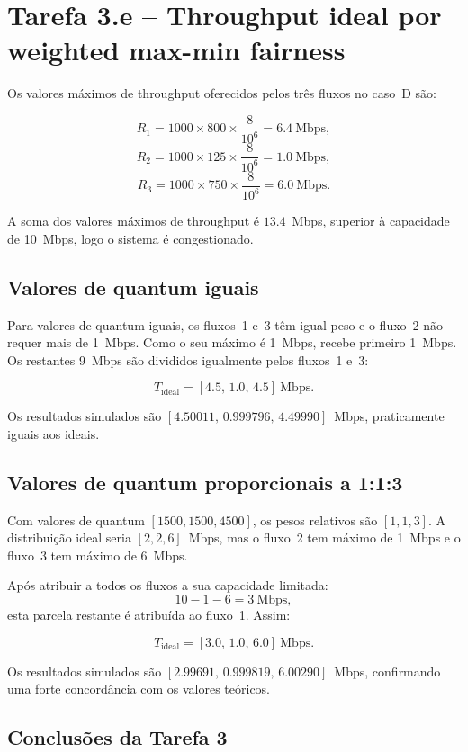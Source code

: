 \documentclass[11pt,a4paper]{article}
\begin{document}
\section{Tarefa 3.e -- Throughput ideal por weighted max-min fairness}

Os valores máximos de throughput oferecidos pelos três fluxos no caso~D são:

\[
R_1=1000\times800\times\frac{8}{10^6}=6.4~\text{Mbps},
\]
\[
R_2=1000\times125\times\frac{8}{10^6}=1.0~\text{Mbps},
\]
\[
R_3=1000\times750\times\frac{8}{10^6}=6.0~\text{Mbps}.
\]

A soma dos valores máximos de throughput é $13.4$~Mbps, superior à capacidade de 10~Mbps,
logo o sistema é congestionado.

\subsection*{Valores de quantum iguais}

Para valores de quantum iguais, os fluxos~1 e~3 têm igual peso e o fluxo~2 não requer
mais de 1~Mbps. Como o seu máximo é 1~Mbps, recebe primeiro 1~Mbps. Os restantes
9~Mbps são divididos igualmente pelos fluxos~1 e~3:

\[
T_{\text{ideal}}=[4.5,\,1.0,\,4.5]\ \text{Mbps}.
\]

Os resultados simulados são
$[4.50011,\,0.999796,\,4.49990]$~Mbps, praticamente iguais aos ideais.

\subsection*{Valores de quantum proporcionais a 1:1:3}

Com valores de quantum $[1500,1500,4500]$, os pesos relativos são $[1,1,3]$. A
distribuição ideal seria $[2,2,6]$~Mbps, mas o fluxo~2 tem máximo de 1~Mbps e
o fluxo~3 tem máximo de 6~Mbps.

Após atribuir a todos os fluxos a sua capacidade limitada:
\[
10-1-6=3~\text{Mbps},
\]
esta parcela restante é atribuída ao fluxo~1. Assim:

\[
T_{\text{ideal}}=[3.0,\,1.0,\,6.0]\ \text{Mbps}.
\]

Os resultados simulados são
$[2.99691,\,0.999819,\,6.00290]$~Mbps, confirmando uma forte concordância com
os valores teóricos.

\subsection*{Conclusões da Tarefa 3}
\end{document}
